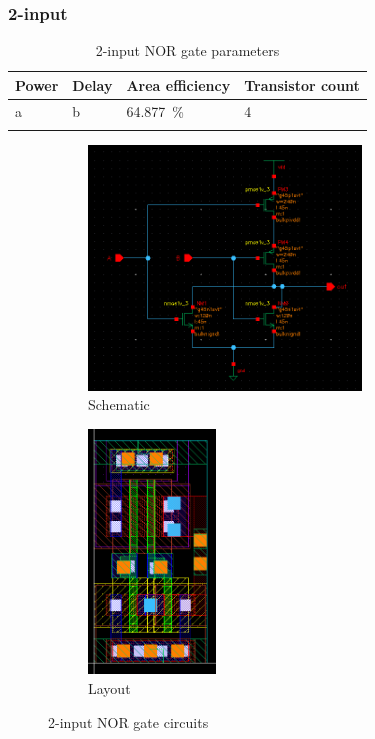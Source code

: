 \subsubsection{2-input}
    \begin{xltabular}{\textwidth}{YYYY}
        Power & Delay & Area efficiency & Transistor count \\
        \hline
        a & b & \qty{64.877}{\percent} & 4 \\
        \hline    
        \caption{2-input NOR gate parameters}
    \end{xltabular}
\begin{figure}[H]
    \begin{subfigure}{0.6\textwidth}
        \centering
        \includegraphics[width=\textwidth,height=6.5cm,keepaspectratio]{./figures/nor2/schematic.png}
        \caption{Schematic}\label{fig:nor2schematic}
    \end{subfigure}
    \hfill
    \begin{subfigure}{0.4\textwidth}
        \centering
        \includegraphics[width=\textwidth,height=6.5cm,keepaspectratio]{./figures/nor2/layout.png}
        \caption{Layout}\label{fig:nor2layout}
    \end{subfigure}
    \caption{2-input NOR gate circuits}
    \end{figure}
    
